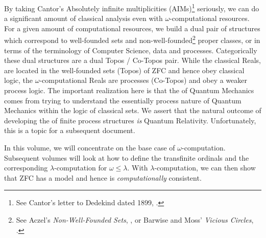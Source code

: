 By taking Cantor's Absolutely infinite multiplicities (AIMs)\footnote{See 
Cantor's letter to Dedekind dated 1899, 
\cite{vanHeijenoort1967fregeToGodel}.} seriously, we can do a significant 
amount of classical analysis even with $\omega$-computational resources. 
For a given amount of computational resources, we build a dual pair of 
structures which correspond to well-founded sets and 
non-well-founded\footnote{See Aczel's \emph{Non-Well-Founded Sets}, 
\cite{aczel1988nonWellFoundedSets}, or Barwise and Moss' \emph{Vicious 
Circles}, \cite{barwiseMoss1996viciousCircles}.} proper classes, or in 
terms of the terminology of Computer Science, data and processes. 
Categorically these dual structures are a dual Topos / Co-Topos pair. 
While the classical Reals, are located in the well-founded sets (Topos) of 
ZFC and hence obey classical logic, the $\omega$-computational Reals are 
processes (Co-Topos) and obey a weaker process logic. The important 
realization here is that the  of Quantum Mechanics 
comes from trying to understand the essentially process nature of Quantum 
Mechanics within the logic of classical sets. We assert that the natural 
outcome of developing the  of finite process structures 
\emph{is} Quantum Relativity. Unfortunately, this is a topic for a 
subsequent document. 

In this volume, we will concentrate on the base case of 
$\omega$-computation. Subsequent volumes will look at how to define the 
transfinite ordinals and the corresponding $\lambda$-computation for 
$\omega \leq \lambda$. With $\lambda$-computation, we can then show that 
ZFC has a model and hence is \emph{computationally} consistent. 


